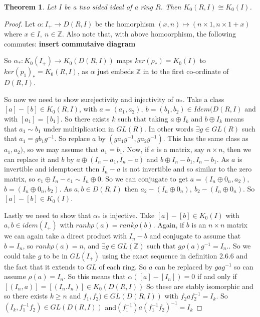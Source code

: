 \documentclass[a4paper,10pt]{article}
\newtheorem{thm}{Theorem}[subsection]
\begin{document}
\begin{thm}
Let $I$ be a two sided ideal of a ring $R$. Then $K_{0}(R,I)\cong K_{0}(I)$.
\end{thm}
\begin{proof}
Let $\alpha:I_{+}\rightarrow D(R,I)$ be the homorphism $(x,n)\mapsto (n\times1,n\times1+x)$ where $x\in I,\ n\in\mathbb{Z}$. Also note that, with above homoorphism, the following commutes:
\newline \textbf{insert commutaive diagram}

So $\alpha_{*}:K_{0}(I_{+})\rightarrow K_{0}(D(R,I))$ maps $ker(\rho_{*})=K_{0}(I)$ to $ker(p_{1})_{*}=K_{0}(R,I)$, as $\alpha$ just embeds $\mathbb{Z}$ in to the first co-ordinate of $D(R,I)$.

So now we need to show surejectivity and injectivity of $\alpha _{*}$. Take a class $[a]-[b]\in K_{0}(R,I)$, with $a=(a_{1},a_{2}),\ b=(b_{1},b_{2})\in Idem(D(R,I)$ and with $[a_{1}]=[b_{1}]$. So there exists $k$ such that taking $a\oplus I_{k}$ and $b\oplus I_{k}$ means that $a_{1}\sim b_{1}$ under multiplication in $GL(R)$. In other words $\exists g\in GL(R)$ such that $a_{1}=gb_{1}g^{-1}$. So replace $a$ by $(ga_{1}g^{-1},ga_{2}g^{-1})$. This has the same class as $a_{1},a_{2})$, so we may assume that $a_{1}=b_{1}$. Now, if $e$ is a matrix, say $n\times n$, then we can replace it and $b$ by $a\oplus (I_{n}-a_{1},I_{n}-a)$ and $b\oplus I_{n}-b_{1},I_{n}-b_{1}$. As $a$ is invertible and idemptoent then $I_{n}-a$ is not invertible and so similar to the zero matrix, so $e_{1}\oplus I_{n}-e_{1}\sim I_{n}\oplus 0$. So we can conjugate to get $a=(I_{n}\oplus 0_{n},a_{2})$, $b=(I_{n}\oplus 0_{n}, b_{2})$. As $a,b \in D(R,I)$ then $a_{2}-(I_{n}\oplus 0_{n}),\ b_{2}-(I_{n}\oplus 0_{n})$. So $[a]-[b]\in K_{0}(I)$.

Lastly we need to show that $\alpha_{*}$ is injective. Take $[a]-[b]\in K_{0}(I)$ with $a,b\in idem(I_{+})$ with $rank \rho(a)=rank\rho(b)$. Again, if $b$ is an $n\times n$ matrix we can again take a direct product with $I_{n}-b$ and conjugate to assume that $b=I_{n}$, so $rank\rho(a)=n$, and $\exists g\in GL(\mathbb{Z})$ such that $g\rho(a) g^{-1}=I_{n}$.. So we could take $g$ to be in $GL(I_{+})$ using the exact sequence in definition 2.6.6 and the fact that it extends to $GL$ of each ring. So $a$ can be replaced by $gag^{-1}$ so can assume  $\rho(a)=I_{n}$. So this means that $\alpha([a]-[I_{n}])=0$ if and only if $[(I_{n},a)]=[(I_{n}.I_{n})]\in K_{0}(D(R,I))$ So these are stably isomorphic  and so there exists $k\geq n$ and $f_{1},f_{2})\in GL(D(R,I))$ with $f_{2}af_{2}^{-1}=I_{k}$. So $(I_{k},f_{1}^{-1}f_{2})\in GL(D(R,I))$ and$(f_{1}^{-1})a(f_{1}^{-1}f_{2})^{-1}=I_{k}$
\end{proof}
\end{document}
